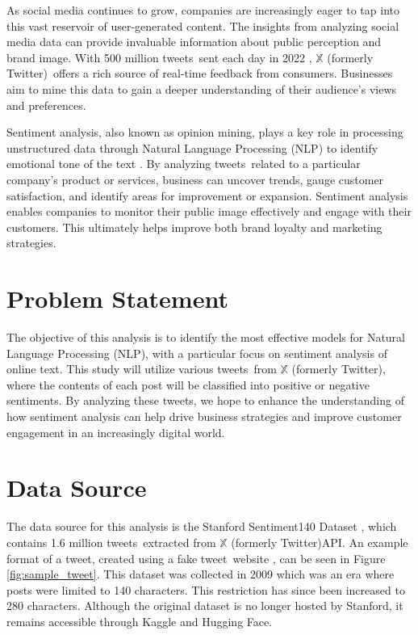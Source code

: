 \documentclass{article}
\newcommand{\twitter}{$\mathbb{X}$ (formerly Twitter)}
\newcommand{\tweets}{tweets}
\newcommand{\tweet}{tweet}
\begin{document}
\begin{multicols}{2}
As social media continues to grow, companies are increasingly eager to tap into this vast reservoir of user-generated content. The insights from analyzing social media data can provide invaluable information about public perception and brand image. With 500 million \tweets\ sent each day in 2022 \cite{sayce2019}, \twitter\ offers a rich source of real-time feedback from consumers. Businesses aim to mine this data to gain a deeper understanding of their audience's views and preferences.

Sentiment analysis, also known as opinion mining, plays a key role in processing unstructured data through Natural Language Processing (NLP) to identify emotional tone of the text \cite{wankhade2022}. By analyzing \tweets\ related to a particular company's product or services, business can uncover trends, gauge customer satisfaction, and identify areas for improvement or expansion. Sentiment analysis enables companies to monitor their public image effectively and engage with their customers. This ultimately helps improve both brand loyalty and marketing strategies. 


\section{Problem Statement}

The objective of this analysis is to identify the most effective models for Natural Language Processing (NLP), with a particular focus on sentiment analysis of online text. This study will utilize various \tweets\ from \twitter, where the contents of each post will be classified into positive or negative sentiments. By analyzing these \tweets, we hope to enhance the understanding of how sentiment analysis can help drive business strategies and improve customer engagement in an increasingly digital world. 


\section{Data Source}

The data source for this analysis is the Stanford Sentiment140 Dataset \cite{go2009twitter}, which contains 1.6 million \tweets\ extracted from \twitter \;API. An example format of a \tweet, created using a fake \tweet\ website \cite{typefully2024}, can be seen in Figure \ref{fig:sample_tweet}. This dataset was collected in 2009 which was an era where posts were limited to 140 characters. This restriction has since been increased to 280 characters. Although the original dataset is no longer hosted by Stanford, it remains accessible through Kaggle \cite{kazanova_sentiment140} and Hugging Face.


\end{multicols}
\end{document}
